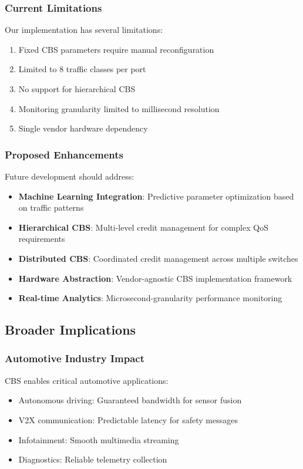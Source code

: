 \documentclass[10pt, journal, compsoc]{IEEEtran}
\begin{document}
\subsubsection{Current Limitations}

Our implementation has several limitations:

\begin{enumerate}
    \item Fixed CBS parameters require manual reconfiguration
    \item Limited to 8 traffic classes per port
    \item No support for hierarchical CBS
    \item Monitoring granularity limited to millisecond resolution
    \item Single vendor hardware dependency
\end{enumerate}

\subsubsection{Proposed Enhancements}

Future development should address:

\begin{itemize}
    \item \textbf{Machine Learning Integration}: Predictive parameter optimization based on traffic patterns
    \item \textbf{Hierarchical CBS}: Multi-level credit management for complex QoS requirements
    \item \textbf{Distributed CBS}: Coordinated credit management across multiple switches
    \item \textbf{Hardware Abstraction}: Vendor-agnostic CBS implementation framework
    \item \textbf{Real-time Analytics}: Microsecond-granularity performance monitoring
\end{itemize}

\subsection{Broader Implications}

\subsubsection{Automotive Industry Impact}

CBS enables critical automotive applications:
\begin{itemize}
    \item Autonomous driving: Guaranteed bandwidth for sensor fusion
    \item V2X communication: Predictable latency for safety messages
    \item Infotainment: Smooth multimedia streaming
    \item Diagnostics: Reliable telemetry collection
\end{itemize}
\end{document}
